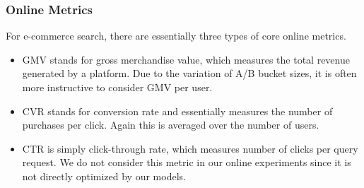 \subsubsection{Online Metrics}
For e-commerce search, there are essentially three types of core online metrics. 
\begin{itemize}
    \item GMV stands for gross merchandise value, which measures the total revenue generated by a platform. Due to the variation of A/B bucket sizes, it is often more instructive to consider GMV per user.
    \item CVR stands for conversion rate and essentially measures the number of purchases per click. Again this is averaged over the number of users.
    \item CTR is simply click-through rate, which measures number of clicks per query request. We do not consider this metric in our online experiments since it is not directly optimized by our models.
\end{itemize}


